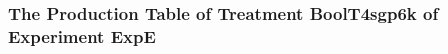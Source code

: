  \begin{frame}
 \fontsize{8pt}{9pt}\selectfont
 \frametitle{ The Production Table of Treatment BoolT4sgp6k of Experiment ExpE }

 \label{ExpEGrammarTable006.tex}  
 \end{frame}

